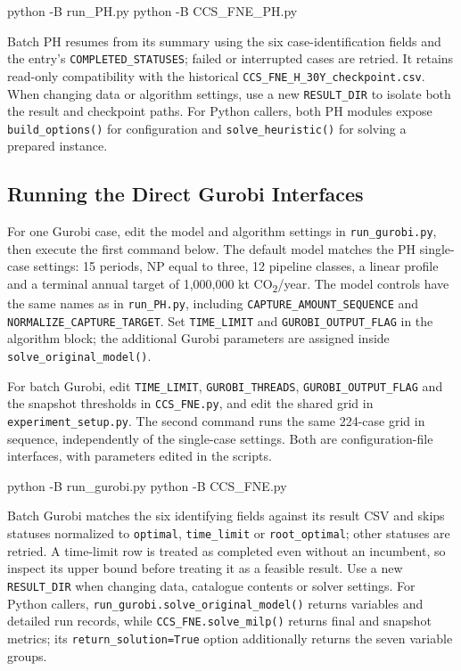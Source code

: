 \documentclass[11pt,letterpaper]{article}
\newcommand{\co}{CO\textsubscript{2}}
\newcommand{\file}[1]{\texttt{\small\nolinkurl{#1}}}
\begin{document}
\begin{commands}
python -B run_PH.py
python -B CCS_FNE_PH.py
\end{commands}

Batch PH resumes from its summary using the six case-identification fields and the entry's \file{COMPLETED_STATUSES}; failed or interrupted cases are retried. It retains read-only compatibility with the historical \file{CCS_FNE_H_30Y_checkpoint.csv}. When changing data or algorithm settings, use a new \file{RESULT_DIR} to isolate both the result and checkpoint paths. For Python callers, both PH modules expose \file{build_options()} for configuration and \file{solve_heuristic()} for solving a prepared instance.

\subsection{Running the Direct Gurobi Interfaces}

For one Gurobi case, edit the model and algorithm settings in \file{run_gurobi.py}, then execute the first command below. The default model matches the PH single-case settings: 15 periods, NP equal to three, 12 pipeline classes, a linear profile and a terminal annual target of 1,000,000 kt \co/year. The model controls have the same names as in \file{run_PH.py}, including \file{CAPTURE_AMOUNT_SEQUENCE} and \file{NORMALIZE_CAPTURE_TARGET}. Set \file{TIME_LIMIT} and \file{GUROBI_OUTPUT_FLAG} in the algorithm block; the additional Gurobi parameters are assigned inside \file{solve_original_model()}.

For batch Gurobi, edit \file{TIME_LIMIT}, \file{GUROBI_THREADS}, \file{GUROBI_OUTPUT_FLAG} and the snapshot thresholds in \file{CCS_FNE.py}, and edit the shared grid in \file{experiment_setup.py}. The second command runs the same 224-case grid in sequence, independently of the single-case settings. Both are configuration-file interfaces, with parameters edited in the scripts.

\begin{commands}
python -B run_gurobi.py
python -B CCS_FNE.py
\end{commands}

Batch Gurobi matches the six identifying fields against its result CSV and skips statuses normalized to \file{optimal}, \file{time_limit} or \file{root_optimal}; other statuses are retried. A time-limit row is treated as completed even without an incumbent, so inspect its upper bound before treating it as a feasible result. Use a new \file{RESULT_DIR} when changing data, catalogue contents or solver settings. For Python callers, \file{run_gurobi.solve_original_model()} returns variables and detailed run records, while \file{CCS_FNE.solve_milp()} returns final and snapshot metrics; its \file{return_solution=True} option additionally returns the seven variable groups.
\end{document}

